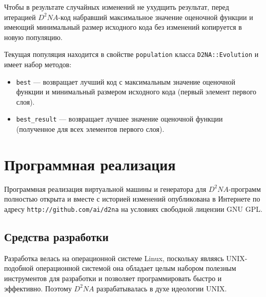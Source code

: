 \documentclass[utf8,a5paper,portrait,10pt,twoside]{eskdtext}
\begin{document}
Чтобы в результате случайных изменений не ухудщить результат, перед итерацией
$D^2NA$-код набравший максимальное значение оценочной функции и имеющий
минимальный размер исходного кода без изменений копируется в новую популяцию.

Текущая популяция находится в свойстве \texttt{population} класса
\texttt{D2NA::Evolution} и имеет набор методов:
\begin{itemize}
  \item \texttt{best} — возвращает лучший код с максимальным значение оценочной
        функции и минимальный размером исходного кода (первый элемент первого
        слоя).
  \item \texttt{best\_result} — возвращает лучшее значение оценочной функции
        (полученное для всех элементов первого слоя).
\end{itemize}

\newpage
\section{Программная реализация}

Программная реализация виртуальной машины и генератора для $D^2NA$-программ
полностью открыта и  вместе с историей изменений опубликована в Интернете по
адресу \texttt{http://github.com/ai/d2na} на условиях свободной лицензии
GNU GPL.

\subsection{Средства разработки}

Разработка велась на операционной системе Linux, поскольку являясь UNIX-подобной
операционной системой она обладает целым набором полезным инструментов для
разработки и позволяет программировать быстро и эффективно. Поэтому $D^2NA$
разрабатывалась в духе идеологии UNIX.
\end{document}
